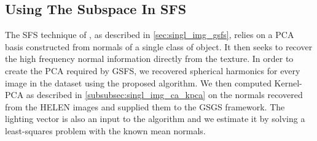 \subsection{Using The Subspace In SFS}\label{subsec:imag_coll_experiments_smith}
The SFS technique of \citet{smith2006recovering}, as described in
\cref{sec:singl_img_gsfs}, relies on a PCA basis
constructed from normals of a single class of object. It then seeks to recover
the high frequency normal information directly from the texture. In order to
create the PCA required by GSFS, we recovered spherical harmonics
for every image in the dataset using the proposed algorithm. We then computed
Kernel-PCA as described in \cref{subsubsec:singl_img_ca_kpca} on the normals
recovered from the HELEN images and supplied them to the GSGS framework.
The lighting vector is also an input to the algorithm and we estimate it by
solving a least-squares problem with the known mean normals.

